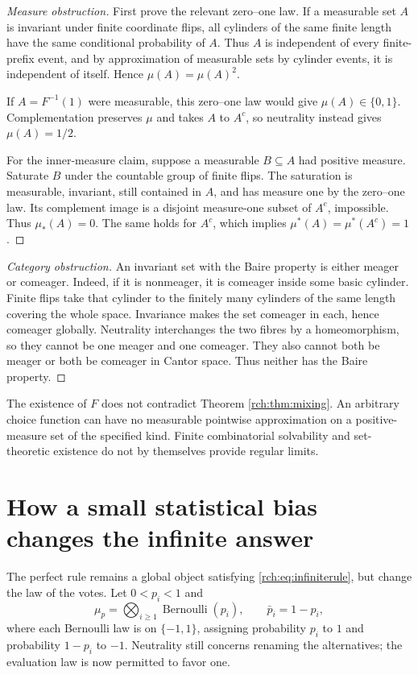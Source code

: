 \documentclass[11pt]{article}
\theoremstyle{definition}
\theoremstyle{remark}
\begin{document}
\begin{proof}[Measure obstruction]
First prove the relevant zero--one law. If a measurable set \(A\) is invariant
under finite coordinate flips, all cylinders of the same finite length have
the same conditional probability of \(A\). Thus \(A\) is independent of
every finite-prefix event, and by approximation of measurable sets by cylinder
events, it is independent of itself. Hence \(\mu(A)=\mu(A)^2\).

If \(A=F^{-1}(1)\) were measurable, this zero--one law would give
\(\mu(A)\in\{0,1\}\). Complementation preserves \(\mu\) and takes
\(A\) to \(A^c\), so neutrality instead gives \(\mu(A)=1/2\).

For the inner-measure claim, suppose a measurable \(B\subseteq A\) had
positive measure. Saturate \(B\) under the countable group of finite flips.
The saturation is measurable, invariant, still contained in \(A\), and has
measure one by the zero--one law. Its complement image is a disjoint
measure-one subset of \(A^c\), impossible. Thus \(\mu_*(A)=0\).
The same holds for \(A^c\), which implies
\(\mu^*(A)=\mu^*(A^c)=1\).
\end{proof}

\begin{proof}[Category obstruction]
An invariant set with the Baire property is either meager or comeager.
Indeed, if it is nonmeager, it is comeager inside some basic cylinder. Finite
flips take that cylinder to the finitely many cylinders of the same length
covering the whole space. Invariance makes the set comeager in each, hence
comeager globally. Neutrality interchanges the two fibres by a homeomorphism,
so they cannot be one meager and one comeager. They also cannot both be
meager or both be comeager in Cantor space. Thus neither has the Baire property.
\end{proof}

The existence of \(F\) does not contradict Theorem \ref{rch:thm:mixing}.
An arbitrary choice function can have no measurable pointwise approximation
on a positive-measure set of the specified kind. Finite combinatorial solvability
and set-theoretic existence do not by themselves provide regular limits.

\section{How a small statistical bias changes the infinite answer}
\label{rch:sec:bias}

The perfect rule remains a global object satisfying
\eqref{rch:eq:infiniterule}, but change the law of the votes. Let
\(0<p_i<1\) and
\begin{equation}
 \mu_p=\bigotimes_{i\ge1}\operatorname{Bernoulli}(p_i),
 \qquad \bar p_i=1-p_i,
 \label{rch:eq:biasedlaw}
\end{equation}
where each Bernoulli law is on \(\{-1,1\}\), assigning probability \(p_i\)
to \(1\) and probability \(1-p_i\) to \(-1\).
Neutrality still concerns renaming the alternatives; the evaluation law is
now permitted to favor one.
\end{document}
